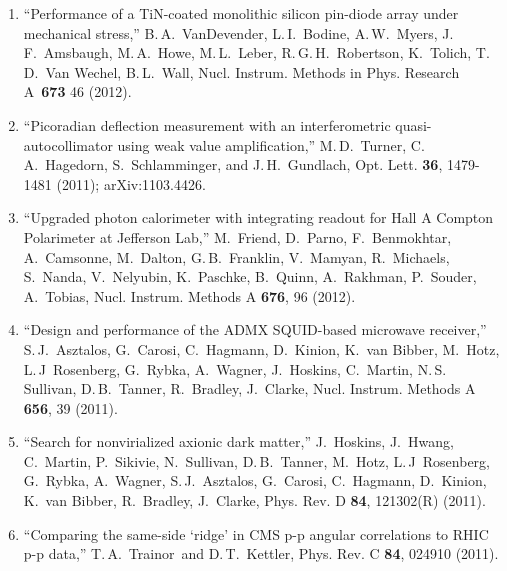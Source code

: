 \begin{enumerate}
\item ``Performance of a TiN-coated monolithic silicon pin-diode array under mechanical stress,'' B.\,A.~VanDevender\leadauthor, L.\,I.~Bodine\leadauthor, A.\,W.~Myers, J.\,F.~Amsbaugh, M.\,A.~Howe, M.\,L.~Leber, R.\,G.\,H.~Robertson, K.~Tolich, T.\,D.~Van Wechel, B.\,L.~Wall, Nucl. Instrum. Methods in Phys. Research A~{\bf 673} 46 (2012).\DOEsupport 


\newpage
\let\thefootnote\relax{}
\let\thefootnote\relax{}

\item ``Picoradian deflection measurement with an interferometric quasi-autocollimator using weak value amplification,'' M.\,D.~Turner, C.\,A.~Hagedorn\leadauthor, S.~Schlamminger, and J.\,H.~Gundlach\leadauthor, Opt. Lett. {\bf 36}, 1479-1481 (2011); arXiv:1103.4426. 
  
\item ``Upgraded photon calorimeter with integrating readout for Hall A Compton Polarimeter at Jefferson Lab,'' M.~Friend, D.~Parno, F.~Benmokhtar, A.~Camsonne, M.~Dalton, G.\,B.~Franklin, V.~Mamyan, R.~Michaels, S.~Nanda, V.~Nelyubin, K.~Paschke, B.~Quinn, A.~Rakhman, P.~Souder, A.~Tobias, Nucl. Instrum. Methods  A {\bf 676}, 96 (2012). 

\item  ``Design and performance of the ADMX SQUID-based microwave receiver,'' S.\,J.~Asztalos, G.~Carosi, C.~Hagmann, D.~Kinion, K.~van Bibber, M.~Hotz, L.\,J~Rosenberg\leadauthor, G.~Rybka, A.~Wagner, J.~Hoskins, C.~Martin, N.\,S.~ Sullivan, D.\,B.~Tanner, R.~Bradley, J.~Clarke,  Nucl. Instrum. Methods A  {\bf  656}, 39 (2011).\DOEsupport 

\item ``Search for nonvirialized axionic dark matter,'' J.~Hoskins, J.~Hwang, C.~Martin, P.~Sikivie, N.~Sullivan, D.\,B.~Tanner, M.~Hotz, L.\,J~Rosenberg, G.~Rybka, A.~Wagner, S.\,J.~Asztalos, G.~Carosi, C.~Hagmann, D.~Kinion, K.~van Bibber, R.~Bradley, J.~Clarke, Phys. Rev. D {\bf  84}, 121302(R) (2011).\DOEsupport 

\item ``Comparing the same-side `ridge' in CMS p-p angular correlations to RHIC p-p data,''  T.\,A.~Trainor\leadauthor~and D.\,T.~Kettler, Phys. Rev. C {\bf 84}, 024910 (2011).\DOEsupport 

\end{enumerate} %

